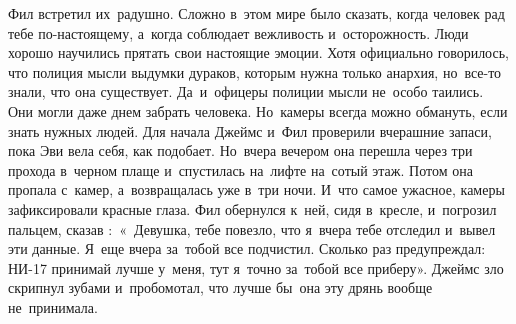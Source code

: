 Фил встретил их~радушно.
Сложно в~этом мире было сказать, когда человек рад тебе по-настоящему, а~когда соблюдает вежливость и~осторожность.
Люди хорошо научились прятать свои настоящие эмоции.
Хотя официально говорилось, что полиция мысли выдумки дураков, которым нужна только анархия, но~все-то знали, что она существует.
Да~и~офицеры полиции мысли не~особо таились.
Они могли даже днем забрать человека.
Но~камеры всегда можно обмануть, если знать нужных людей.
Для начала Джеймс и~Фил проверили вчерашние запаси, пока Эви вела себя, как подобает.
Но~вчера вечером она перешла через три прохода в~черном плаще и~спустилась на~лифте на~сотый этаж.
Потом она пропала с~камер, а~возвращалась уже в~три ночи.
И~что самое ужасное, камеры зафиксировали красные глаза.
Фил обернулся к~ней, сидя в~кресле, и~погрозил пальцем, сказав :~«~Девушка, тебе повезло, что я~вчера тебе отследил и~вывел эти данные.
Я~еще вчера за~тобой все подчистил.
Сколько раз предупреждал: НИ-17 принимай лучше у~меня, тут я~точно за~тобой все приберу».
Джеймс зло скрипнул зубами и~пробомотал, что лучше бы~она эту дрянь вообще не~принимала.

